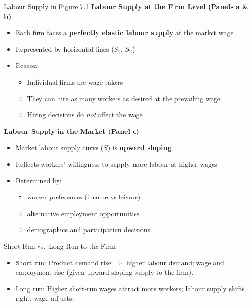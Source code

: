 \documentclass[aspectratio=169]{beamer}
\begin{document}
\begin{frame}{Labour Supply in Figure 7.1}
\textbf{Labour Supply at the Firm Level (Panels a \& b)}
\begin{itemize}
\item Each firm faces a \textbf{perfectly elastic labour supply} at the market wage
\item Represented by horizontal lines ($S_1$, $S_2$)
\item Reason:
\begin{itemize}
\item Individual firms are wage takers
\item They can hire as many workers as desired at the prevailing wage
\item Hiring decisions do \emph{not} affect the wage
\end{itemize}
\end{itemize}

\vspace{0.3cm}

\textbf{Labour Supply in the Market (Panel c)}
\begin{itemize}
\item Market labour supply curve ($S$) is \textbf{upward sloping}
\item Reflects workers’ willingness to supply more labour at higher wages
\item Determined by:
\begin{itemize}
\item worker preferences (income vs leisure)
\item alternative employment opportunities
\item demographics and participation decisions
\end{itemize}
\end{itemize}

\end{frame}


\begin{frame}{Short Run vs.\ Long Run to the Firm}
\transfade
\begin{itemize}
  \item Short run: Product demand rise \(\Rightarrow\) higher labour demand; wage and employment rise (given upward-sloping supply to the firm).
  \item Long run: Higher short-run wages attract more workers; labour supply shifts right; wage adjusts.
\end{itemize}
\end{frame}
\end{document}
